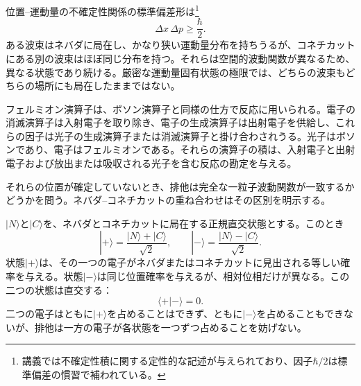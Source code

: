 \begin{classroomqa}
\end{classroomqa}

位置--運動量の不確定性関係の標準偏差形は\footnote{講義では不確定性積に関する定性的な記述が与えられており、因子\(\hbar/2\)は標準偏差の慣習で補われている。}
\begin{equation}
\Delta x\,\Delta p\geq\frac{\hbar}{2}.
\end{equation}
ある波束はネバダに局在し、かなり狭い運動量分布を持ちうるが、コネチカットにある別の波束はほぼ同じ分布を持つ。それらは空間的波動関数が異なるため、異なる状態であり続ける。厳密な運動量固有状態の極限では、どちらの波束もどちらの場所にも局在したままではない。

フェルミオン演算子は、ボソン演算子と同様の仕方で反応に用いられる。電子の消滅演算子は入射電子を取り除き、電子の生成演算子は出射電子を供給し、これらの因子は光子の生成演算子または消滅演算子と掛け合わされうる。光子はボソンであり、電子はフェルミオンである。それらの演算子の積は、入射電子と出射電子および放出または吸収される光子を含む反応の勘定を与える。

\begin{classroomqa}
\end{classroomqa}


それらの位置が確定していないとき、排他は完全な一粒子波動関数が一致するかどうかを問う。ネバダ--コネチカットの重ね合わせはその区別を明示する。

\(|N\rangle\)と\(|C\rangle\)を、ネバダとコネチカットに局在する正規直交状態とする。このとき
\begin{equation}
|+\rangle=\frac{|N\rangle+|C\rangle}{\sqrt2},
\qquad
|-\rangle=\frac{|N\rangle-|C\rangle}{\sqrt2}.
\end{equation}
状態\(|+\rangle\)は、その一つの電子がネバダまたはコネチカットに見出される等しい確率を与える。状態\(|-\rangle\)は同じ位置確率を与えるが、相対位相だけが異なる。この二つの状態は直交する：
\begin{equation}
\langle+|-\rangle=0.
\end{equation}
二つの電子はともに\(|+\rangle\)を占めることはできず、ともに\(|-\rangle\)を占めることもできないが、排他は一方の電子が各状態を一つずつ占めることを妨げない。

